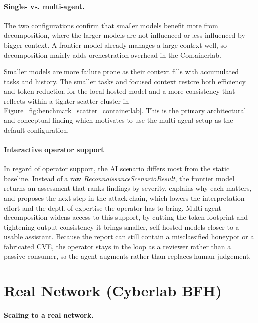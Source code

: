 \paragraph{Single- vs. multi-agent.}

The two configurations confirm that smaller models benefit more from decomposition, where the larger models are not
influenced or less influenced by bigger context.
A frontier model already manages a large context well, so decomposition mainly adds orchestration overhead in the \gls{Containerlab}.

Smaller models are more failure prone as their context fills with accumulated tasks and history.
The smaller tasks and focused context restore both efficiency and token reduction for the local hosted model and a
more consistency that reflects within a tighter scatter cluster in Figure~\ref{fig:benchmark_scatter_containerlab}.
This is the primary architectural and conceptual finding which motivates to use the multi-agent setup as the default configuration.

\paragraph{Interactive operator support}

In regard of operator support, the \gls{AI} scenario differs most from the static baseline.
Instead of a raw \textit{ReconnaissanceScenarioResult}, the frontier model returns an assessment that ranks findings by
severity, explains why each matters, and proposes the next step in the attack chain, which lowers the interpretation
effort and the depth of expertise the operator has to bring.
Multi-agent decomposition widens access to this support, by cutting the token footprint and tightening output
consistency it brings smaller, self-hosted models closer to a usable assistant.
Because the report can still contain a misclassified honeypot or a fabricated \gls{CVE}, the operator stays in the loop
as a reviewer rather than a passive consumer, so the agent augments rather than replaces human
judgement.

\section{Real Network (Cyberlab BFH)}\label{sec:discussion-cyberlab}

\paragraph{Scaling to a real network.}

